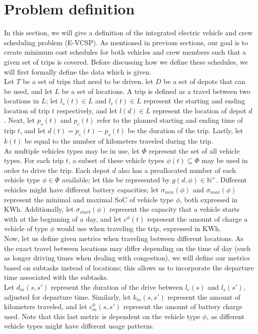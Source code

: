 \documentclass[]{article}
\begin{document}
\section{Problem definition}
\label{sec:problem_def}
In this section, we will give a definition of the integrated electric vehicle and crew scheduling problem (E-VCSP). As mentioned in previous sections, our goal is to create minimum cost schedules for both vehicles and crew members such that a given set of trips is covered. Before discussing how we define these schedules, we will first formally define the data which is given. \\
Let $T$ be a set of trips that need to be driven, let $D$ be a set of depots that can be used, and let $L$ be a set of locations. A trip is defined as a travel between two locations in $L$; let $l_s(t) \in L$ and $l_e(t) \in L$ represent the starting and ending location of trip $t$ respectively, and let $l(d) \in L$ represent the location of depot $d$. Next, let $p_s(t)$ and $p_e(t)$ refer to the planned starting and ending time of trip $t$, and let $d(t) = p_e(t) - p_s(t)$ be the duration of the trip. Lastly, let $k(t)$ be equal to the number of kilometers traveled during the trip. \\
As multiple vehicles types may be in use, let $\Phi$ represent the set of all vehicle types. For each trip $t$, a subset of these vehicle types $\phi(t) \subseteq \Phi$ may be used in order to drive the trip. Each depot $d$ also has a preallocated number of each vehicle type $\phi \in \Phi$ available; let this be represented by $g(d, \phi) \in \mathbb{N}^+$. Different vehicles might have different battery capacities; let $\sigma_{min}(\phi)$ and $\sigma_{max}(\phi)$ represent the minimal and maximal SoC of vehicle type $\phi$, both expressed in KWh. Additionally, let $\sigma_{start}(\phi)$ represent the capacity that a vehicle starts with at the beginning of a day, and let $c^\phi(t)$ represent the amount of charge a vehicle of type $\phi$ would use when traveling the trip, expressed in KWh. \\
Now, let us define given metrics when traveling between different locations. As the exact travel between locations may differ depending on the time of day (such as longer driving times when dealing with congestion), we will define our metrics based on subtasks instead of locations; this allows us to incorporate the departure time associated with the subtasks.\\
Let $d_m(s, s')$ represent the duration of the drive between $l_e(s)$ and $l_s(s')$, adjusted for departure time. Similarly, let $k_m(s, s')$ represent the amount of kilometers traveled, and let $c^\phi_m(s, s')$ represent the amount of battery charge used. Note that this last metric is dependent on the vehicle type $\phi$, as different vehicle types might have different usage patterns. \\
\end{document}
